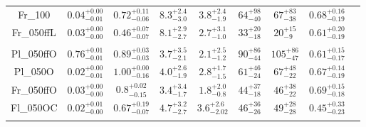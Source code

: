 \documentclass[submission,phys]{lib/SciPost}
\begin{document}
\begin{table}
\begin{tabular}{c c c c c c c c c}
           Fr\_100      & $0.04^{+0.00}_{-0.01}$ & $0.72^{+0.11}_{-0.06}$ & $8.3^{+2.4}_{-3.0}$ & $3.8^{+2.4}_{-1.9}$ & $64^{+98}_{-40}$ & $67^{+83}_{-38}$ & $0.68^{+0.16}_{-0.19}$ \vspace{0.25em}\\
           Fr\_050ffL  & $0.03^{+0.00}_{-0.00}$ & $0.46^{+0.07}_{-0.07}$ & $8.1^{+2.9}_{-2.7}$ & $2.7^{+3.1}_{-1.0}$ & $33^{+20}_{-18}$ & $20^{+15}_{-9}$ & $0.61^{+0.20}_{-0.19}$ \vspace{0.25em}\\
           \hline \vspace{-0.75em}\\
           Pl\_050ffO  & $0.76^{+0.01}_{-0.01}$ & $0.89^{+0.03}_{-0.03}$ & $3.7^{+3.5}_{-2.1}$ & $2.1^{+2.5}_{-1.2}$ & $90^{+86}_{-44}$ & $105^{+86}_{-47}$ & $0.61^{+0.15}_{-0.17}$ \vspace{0.25em}\\
           Pl\_050O    & $0.02^{+0.00}_{-0.01}$ & $1.00^{+0.00}_{-0.16}$ & $4.0^{+2.6}_{-1.9}$ & $2.8^{+1.7}_{-1.5}$ & $61^{+46}_{-24}$ & $67^{+48}_{-22}$ & $0.67^{+0.14}_{-0.19}$ \vspace{0.25em}\\
           Fr\_050ffO  & $0.03^{+0.00}_{-0.00}$ & $0.8^{+0.02}_{-0.15}$ & $3.4^{+3.4}_{-1.7}$ & $1.8^{+2.0}_{-0.8}$ & $44^{+37}_{-18}$ & $46^{+38}_{-22}$ & $0.69^{+0.15}_{-0.18}$ \vspace{0.25em}\\
           Fl\_050OC   & $0.02^{+0.01}_{-0.00}$ & $0.67^{+0.19}_{-0.07}$ & $4.7^{+3.2}_{-2.7}$ & $3.6^{+2.6}_{-2.02}$ & $46^{+36}_{-26}$ & $49^{+28}_{-28}$ & $0.45^{+0.33}_{-0.23}$ \vspace{0.25em}\\
           \hline
         \hline                                   %
         \label{Tab:Final_ISF_FFC_Results}
        \end{tabular}
     \end{table}
\end{document}
